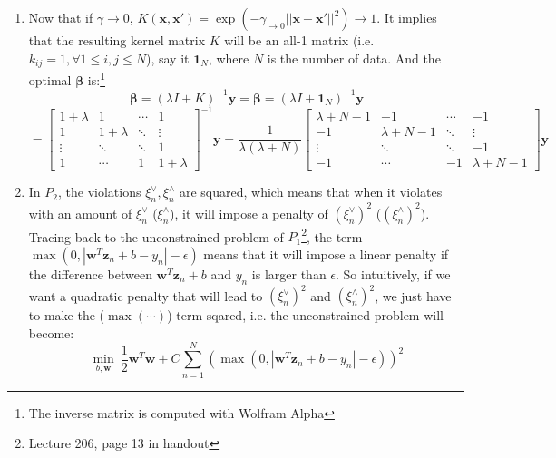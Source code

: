 \documentclass[11pt]{article}
\begin{document}
\begin{enumerate}[label=\textbf{\arabic*}.]
  \item Now that if $\gamma \rightarrow 0$, $K(\mathbf{x}, \mathbf{x'}) = \exp (-\gamma_{\rightarrow 0} ||\mathbf{x}-\mathbf{x'}||^2) \rightarrow 1$. It implies that the resulting kernel matrix $K$ will be an all-1 matrix (i.e. $k_{ij}=1, \forall 1\leq i, j\leq N$), say it $\mathbf{1}_N$, where $N$ is the number of data. And the optimal $\bm{\beta}$ is:\footnote{The inverse matrix is computed with Wolfram Alpha}
  \[\bm{\beta} = (\lambda I + K)^{-1} \mathbf{y} = \bm{\beta} = (\lambda I + \mathbf{1}_N)^{-1} \mathbf{y}\]
  \[ = \left[ \begin{array}{cccc} 1+\lambda & 1 & \cdots & 1 \\ 1 & 1+\lambda & \ddots & \vdots \\ \vdots & \ddots & \ddots & 1\\ 1 & \cdots & 1 & 1+\lambda \end{array} \right]^{-1} \mathbf{y} = \frac{1}{\lambda (\lambda + N)} \left[ \begin{array}{cccc} \lambda + N - 1 & -1 & \cdots & -1 \\ -1 & \lambda + N - 1 & \ddots & \vdots \\ \vdots & \ddots & \ddots & -1\\ -1 & \cdots & -1 & \lambda + N - 1 \end{array} \right]\mathbf{y}\]

  \item In $P_2$, the violations $\xi_n^\vee, \xi_n^\wedge$ are squared, which means that when it violates with an amount of $\xi_n^\vee$ ($\xi_n^\wedge$), it will impose a penalty of $(\xi_n^\vee)^2$ ($(\xi_n^\wedge)^2$). Tracing back to the unconstrained problem of $P_1$\footnote{Lecture 206, page 13 in handout}, the term $\max (0, |\mathbf{w}^T \mathbf{z}_n+b-y_n|-\epsilon)$ means that it will impose a linear penalty if the difference between $\mathbf{w}^T \mathbf{z}_n+b$ and $y_n$ is larger than $\epsilon$. So intuitively, if we want a quadratic penalty that will lead to $(\xi_n^\vee)^2$ and $(\xi_n^\wedge)^2$, we just have to make the ($\max (\cdots)$) term sqared, i.e. the unconstrained problem will become:
  \[\underset{b, \mathbf{w}}\min\ \frac{1}{2}\mathbf{w}^T\mathbf{w} + C \sum_{n=1}^N (\max (0, |\mathbf{w}^T \mathbf{z}_n+b-y_n|-\epsilon))^2\]


\end{enumerate}
\end{document}
